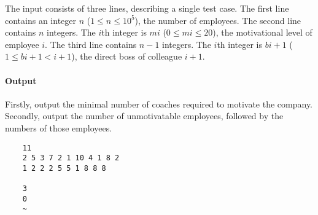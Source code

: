 The input consists of three lines, describing a single test case.
The first line contains an integer $n$ ($1 \leq n \leq 10^5$), the number of employees.
The second line contains $n$ integers. The $i$th integer is $mi$ ($0 \leq mi \leq 20$), the motivational level of employee $i$.
The third line contains $n - 1$ integers. The $i$th integer is $bi+1$ ($1 \leq bi+1 < i + 1$), the direct boss of colleague $i + 1$.

\paragraph*{Output}

Firstly, output the minimal number of coaches required to motivate the company. Secondly, output the number of 
unmotivatable employees, followed by the numbers of those employees.


\begin{samples}
  \begin{verbatim}
    11
    2 5 3 7 2 1 10 4 1 8 2
    1 2 2 2 5 5 1 8 8 8

    3
    0
    ~
  \end{verbatim}
\end{samples}


